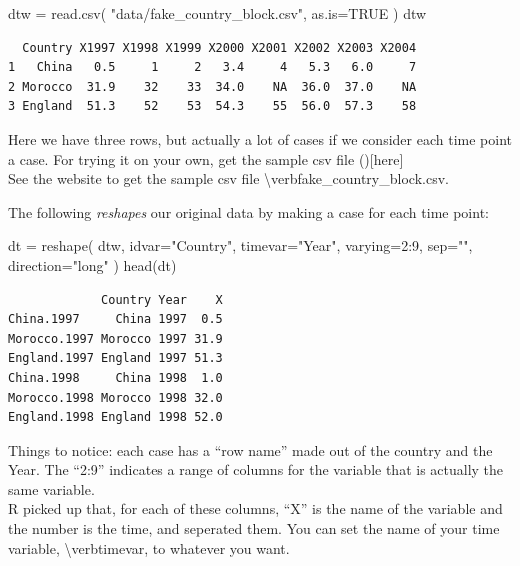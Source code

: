 \documentclass[
  letterpaper,
  DIV=11,
  numbers=noendperiod]{scrreprt}
\newenvironment{Shaded}{\begin{snugshade}}{\end{snugshade}}
\newcommand{\AttributeTok}[1]{\textcolor[rgb]{0.49,0.56,0.16}{#1}}
\newcommand{\ConstantTok}[1]{\textcolor[rgb]{0.53,0.00,0.00}{#1}}
\newcommand{\DecValTok}[1]{\textcolor[rgb]{0.25,0.63,0.44}{#1}}
\newcommand{\FunctionTok}[1]{\textcolor[rgb]{0.02,0.16,0.49}{#1}}
\newcommand{\NormalTok}[1]{\textcolor[rgb]{0.00,0.44,0.13}{#1}}
\newcommand{\OtherTok}[1]{\textcolor[rgb]{0.00,0.44,0.13}{#1}}
\newcommand{\SpecialCharTok}[1]{\textcolor[rgb]{0.25,0.44,0.63}{#1}}
\newcommand{\StringTok}[1]{\textcolor[rgb]{0.25,0.44,0.63}{#1}}
\begin{document}
\begin{Shaded}
\begin{Highlighting}[]
\NormalTok{dtw }\OtherTok{=} \FunctionTok{read.csv}\NormalTok{( }\StringTok{"data/fake\_country\_block.csv"}\NormalTok{, }\AttributeTok{as.is=}\ConstantTok{TRUE}\NormalTok{ )}
\NormalTok{dtw}
\end{Highlighting}
\end{Shaded}

\begin{verbatim}
  Country X1997 X1998 X1999 X2000 X2001 X2002 X2003 X2004
1   China   0.5     1     2   3.4     4   5.3   6.0     7
2 Morocco  31.9    32    33  34.0    NA  36.0  37.0    NA
3 England  51.3    52    53  54.3    55  56.0  57.3    58
\end{verbatim}

Here we have three rows, but actually a lot of cases if we consider each
time point a case. For trying it on your own, get the sample csv file
(){[}here{]}\\
See the website to get the sample csv file
\textbackslash verb\textbar fake\_country\_block.csv\textbar.

The following \emph{reshapes} our original data by making a case for
each time point:

\begin{Shaded}
\begin{Highlighting}[]
\NormalTok{dt }\OtherTok{=} \FunctionTok{reshape}\NormalTok{( dtw, }\AttributeTok{idvar=}\StringTok{"Country"}\NormalTok{, }\AttributeTok{timevar=}\StringTok{"Year"}\NormalTok{, }\AttributeTok{varying=}\DecValTok{2}\SpecialCharTok{:}\DecValTok{9}\NormalTok{, }\AttributeTok{sep=}\StringTok{""}\NormalTok{, }\AttributeTok{direction=}\StringTok{"long"}\NormalTok{ )}
\FunctionTok{head}\NormalTok{(dt)}
\end{Highlighting}
\end{Shaded}

\begin{verbatim}
             Country Year    X
China.1997     China 1997  0.5
Morocco.1997 Morocco 1997 31.9
England.1997 England 1997 51.3
China.1998     China 1998  1.0
Morocco.1998 Morocco 1998 32.0
England.1998 England 1998 52.0
\end{verbatim}

Things to notice: each case has a ``row name'' made out of the country
and the Year. The ``2:9'' indicates a range of columns for the variable
that is actually the same variable.\\
R picked up that, for each of these columns, ``X'' is the name of the
variable and the number is the time, and seperated them. You can set the
name of your time variable, \textbackslash verb\textbar timevar\textbar,
to whatever you want.
\end{document}
